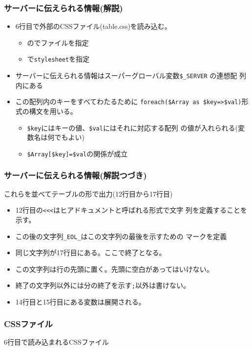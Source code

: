 \begin{frame}[containsverbatim]
 \frametitle{サーバーに伝えられる情報(解説)}
 \begin{itemize}
	\item 6行目で外部のCSSファイル(table.css)を読み込む。
				\begin{itemize}
				 \item {}のでファイルを指定
				 \item {}で\Verb+stylesheet+を指定
				\end{itemize}
	\item サーバーに伝えられる情報はスーパーグローバル変数\texttt{\$\_SERVER} の連想配
       列内にある
	\item この配列内のキーをすべてわたるために
				\Verb+foreach($Array as $key=>$val)+形式の構文を用いる。
				\begin{itemize}
				 \item \Verb+$key+にはキーの値、\Verb+$val+にはそれに対応する配列
							 の値が入れられる(変数名は何でもよい)
				 \item \Verb+$Array[$key]=$val+の関係が成立
				\end{itemize}
 \end{itemize}
\end{frame}
\begin{frame}[containsverbatim]
 \frametitle{サーバーに伝えられる情報(解説つづき)}
	これらを並べてテーブルの形で出力(12行目から17行目)
				\begin{itemize}
				 \item 12行目の\Verb+<<<+はヒアドキュメントと呼ばれる形式で文字
							 列を定義することを示す。
				 \item この後の文字列\Verb+_EOL_+はこの文字列の最後を示すための
							 マークを定義
				 \item 同じ文字列が17行目にある。ここで終了となる。
				 \item この文字列は行の先頭に置く。先頭に空白があってはいけない。
				 \item 終了の文字列以外には分の終了を示す\Verb+;+以外は書けない。
				 \item 14行目と15行目にある変数は展開される。
				\end{itemize}
\end{frame}
\begin{frame}[containsverbatim]
 \frametitle{CSSファイル}
 6行目で読み込まれるCSSファイル
\end{frame}

